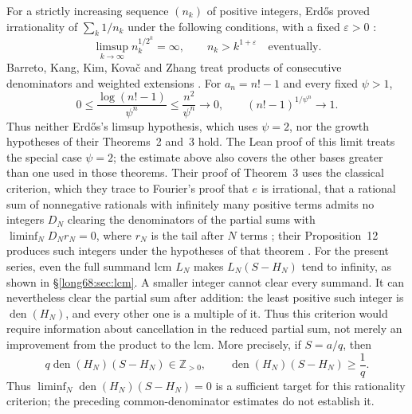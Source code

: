 \documentclass[11pt]{article}
\newcommand{\Lc}{L}
\newcommand{\den}{\operatorname{den}}
\begin{document}
For a strictly increasing sequence $(n_k)$ of positive integers,
Erd\H{o}s proved irrationality of $\sum_k1/n_k$ under the following
conditions, with a fixed $\varepsilon>0$ \cite[Theorem~1, p.~1]{erdos1975}:
\[
 \limsup_{k\to\infty}n_k^{1/2^k}=\infty,
 \qquad n_k>k^{1+\varepsilon}\quad\text{eventually}.
\]
Barreto, Kang, Kim, Kova\v{c}
and Zhang treat products of consecutive denominators and weighted extensions
\cite[Thms.~2--3 and Rem.~4, pp.~2--5]{barreto-et-al}.  For $a_n=n!-1$ and every fixed $\psi>1$,
\[
 0\le\frac{\log(n!-1)}{\psi^n}\le\frac{n^2}{\psi^n}\longrightarrow0,
 \qquad (n!-1)^{1/\psi^n}\longrightarrow1.
\]
Thus neither Erd\H{o}s's limsup hypothesis, which uses $\psi=2$, nor the
growth hypotheses of their Theorems~2 and~3 hold. The Lean proof of this
limit treats the special case $\psi=2$; the estimate above also covers the other
bases greater than one used in those theorems.  Their proof of Theorem~3 uses the classical
criterion, which they trace to Fourier's proof that $e$ is irrational, that a
rational sum of nonnegative rationals with infinitely many positive terms
admits no integers $D_N$ clearing the denominators of the partial sums
with $\liminf_ND_Nr_N=0$, where $r_N$
is the tail after $N$ terms \cite[Lem.~8, p.~6]{barreto-et-al}; their
Proposition~12 produces such integers under the hypotheses of that theorem
\cite[pp.~9--12]{barreto-et-al}.
For the present series, even the full summand lcm $\Lc_N$ makes
$\Lc_N(S-H_N)$ tend to infinity, as shown in \S\ref{long68:sec:lcm}.
A smaller integer cannot clear every summand. It can nevertheless clear
the partial sum after addition: the least positive such integer is
$\den(H_N)$, and every other one is a multiple of it. Thus this criterion
would require information about cancellation in the reduced partial sum,
not merely an improvement from the product to the lcm. More precisely, if
$S=a/q$, then
\[
 q\den(H_N)(S-H_N)\in\mathbb Z_{>0},
 \qquad \den(H_N)(S-H_N)\ge\frac1q.
\]
Thus $\liminf_N\den(H_N)(S-H_N)=0$ is a sufficient target for this
rationality criterion; the preceding common-denominator estimates
do not establish it.
\end{document}
